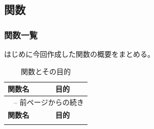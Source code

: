 \documentclass[uplatex,dvipdfmx,a4paper]{jsarticle}
\begin{document}
\clearpage
\subsection{関数}
\subsubsection{関数一覧}
はじめに今回作成した関数の概要をまとめる。
\begin{longtable}{lp{}}
    \caption{関数とその目的}
    \label{tab:functions_long} \\

    \toprule
    \textbf{関数名} & \textbf{目的} \\
    \midrule
    \endfirsthead

    \multicolumn{2}{l}{\tablename~\thetable{} -- 前ページからの続き} \\
    \toprule
    \textbf{関数名} & \textbf{目的} \\
    \midrule
    \endhead

    \bottomrule
    \endlastfoot


\end{longtable}
\end{document}
